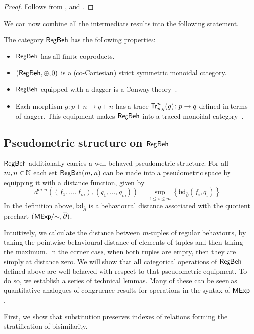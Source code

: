 \begin{proof}
	Follows from ,  and .
\end{proof}
We can now combine all the intermediate results into the following statement.
\begin{theorem}
	The category $\mathsf{RegBeh}$ has the following properties:
	\begin{itemize}
		\item $\mathsf{RegBeh}$ has all finite coproducts. 
		\item $(\mathsf{RegBeh}, \oplus, 0)$ is a (co-Cartesian) strict symmetric monoidal category.
		\item $\mathsf{RegBeh}$ equipped with a dagger is a Conway theory~\cite{Esik:1999:Group}.
		\item Each morphism $g \colon p + n \to q + n$ has a trace $\mathsf{Tr}^{n}_{p,q}(g) \colon p \to q$ defined in terms of dagger. This equipment makes $\mathsf{RegBeh}$ into a traced monoidal category~\cite{Joyal:1996:Traced}. 
	\end{itemize}
\end{theorem} 
\subsection{Pseudometric structure on $\mathsf{RegBeh}$}
$\mathsf{RegBeh}$ additionally carries a well-behaved pseudometric structure. For all $m,n \in \mathbb{N}$ each set $\mathsf{RegBeh}(m,n)$ can be made into a pseudometric space by equipping it with a distance function, given by $$d^{m,n}((f_1, \dots, f_m), (g_1, \dots, g_m)) = \sup_{1 \leq i \leq m} \left\{ \mathsf{bd}_{\overline{\partial}}(f_i, g_i) \right\}$$
In the definition above, $\mathsf{bd}_{\overline{\partial}}$ is a behavioural distance associated with the quotient prechart $({\mathsf{MExp}}/{\sim}, \overline{\partial} )$.

Intuitively, we calculate the distance between $m$-tuples of regular behaviours, by taking the pointwise behavioural distance of elements of tuples and then taking the maximum. In the corner case, when both tuples are empty, then they are simply at distance zero. We will show that all categorical operations of $\mathsf{RegBeh}$ defined above are well-behaved with respect to that pseudometric equipment. To do so, we establish a series of technical lemmas. Many of these can be seen as quantitative analogues of congruence results for operations in the syntax of $\mathsf{MExp}$.

First, we show that substitution preserves indexes of relations forming the stratification of bisimilarity.

